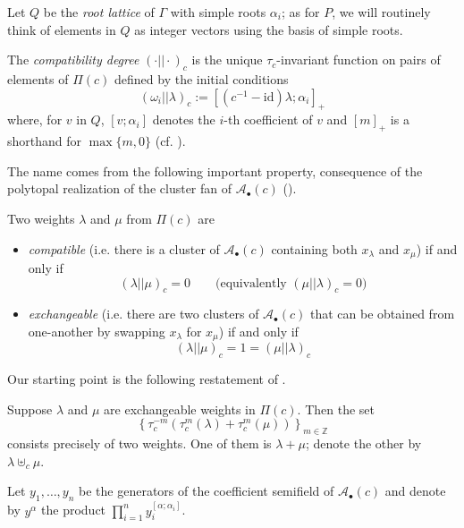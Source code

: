 \documentclass[pdftex]{sigma}
\numberwithin{equation}{section}
\numberwithin{theorem}{section}
\numberwithin{proposition}{section}
\numberwithin{lemma}{section}
\numberwithin{corollary}{section}
\numberwithin{definition}{section}
\numberwithin{example}{section}
\numberwithin{remark}{section}
\numberwithin{note}{section}
\newcommand{\cA}{\mathcal{A}}
\newcommand{\ZZ}{\mathbb{Z}}
\newcommand{\id}{\mathrm{id}}
\begin{document}
  Let $Q$ be the \emph{root lattice} of $\Gamma$ with simple roots $\alpha_i$; as for $P$, we will routinely think of elements in $Q$ as integer vectors using the basis of simple roots.
  \begin{definition}
    The \emph{compatibility degree} $(\cdot||\cdot)_c$ is the unique $\tau_c$-invariant function on pairs of elements of $\Pi(c)$ defined by the initial conditions
    \[
      (\omega_i||\lambda)_c
      :=
      \left[ (c^{-1}-\id)\lambda ; \alpha_i\right]_+
    \]
    where, for $v$ in $Q$, $[v;\alpha_i]$ denotes the $i$-th coefficient of $v$  and $[m]_+$ is a shorthand for $\max\{m, 0\}$ (cf. \cite[Proposition 5.1]{YZ08}).
  \end{definition}
  The name comes from the following important property, consequence of the polytopal realization of the cluster fan of $\cA_\bullet(c)$ (\cite{CFZ02,Ste13}).
  \begin{proposition}
    Two weights $\lambda$ and $\mu$ from $\Pi(c)$ are
    \begin{itemize}
      \item
        \emph{compatible} (i.e. there is a cluster of $\cA_\bullet(c)$ containing both $x_\lambda$ and $x_\mu$) if and only if
        \[
          (\lambda||\mu)_c = 0
          \quad \quad
          \text{(equivalently $(\mu||\lambda)_c=0$)}
        \]

      \item
        \emph{exchangeable} (i.e. there are two clusters of $\cA_\bullet(c)$ that can be obtained from one-another by swapping $x_\lambda$ for $x_\mu$) if and only if
        \[
          (\lambda||\mu)_c = 1 = (\mu||\lambda)_c
        \]
    \end{itemize}
  \end{proposition}

  Our starting point is the following restatement of \cite[Proposition 5.1]{Ste13}.
  \begin{proposition}
    Suppose $\lambda$ and $\mu$ are exchangeable weights in $\Pi(c)$.
    Then the set
    \[
      \left\{
        \tau_c^{-m}\left(\tau_c^m(\lambda)+\tau_c^m(\mu)\right)
      \right\}_{m\in\ZZ}
    \]
    consists precisely of two weights.
    One of them is $\lambda+\mu$; denote the other by $\lambda\uplus_c\mu$.
  \end{proposition}

  Let $y_1,\dots,y_n$ be the generators of the coefficient semifield of $\cA_\bullet(c)$ and denote by $y^\alpha$ the product $\prod_{i=1}^n y_i^{[\alpha;\alpha_i]}$.
\end{document}
